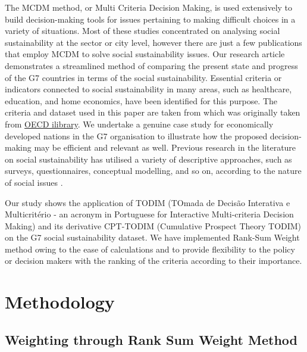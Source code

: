 \documentclass{infor}
\theoremstyle{remark}
\begin{document}
The MCDM method, or Multi Criteria Decision Making, is used extensively to build decision-making tools for issues pertaining to making difficult choices in a variety of situations. Most of these studies \citep{kumar2020mcdm, khokhar2020evaluating, perez2021mcdm, torkayesh2021comparative, kumar2019development, anand2017evaluation, papathanasiou2016decision, mani2014supplier} concentrated on analysing social sustainability at the sector or city level, however there are just a few publications that employ MCDM to solve social sustainability issues. Our research article demonstrates a streamlined method of comparing the present state and progress of the G7 countries in terms of the social sustainability. Essential criteria or indicators connected to social sustainability in many areas, such as healthcare, education, and home economics, have been identified for this purpose. The criteria and dataset used in this paper are taken from \cite{torkayesh2021comparative} which was originally taken from \href{https://www.oecd-ilibrary.org/}{OECD ilibrary}. We undertake a genuine case study for economically developed nations in the G7 organisation to illustrate how the proposed decision-making may be efficient and relevant as well. Previous research in the literature on social sustainability has utilised a variety of descriptive approaches, such as surveys, questionnaires, conceptual modelling, and so on, according to the nature of social issues \citep{abousaeidi2020developing, navas2020colombian, d2019social, hussain2018exploration, mani2016social}.

Our study shows the application of TODIM (TOmada de Decisão Interativa e Multicritério - an acronym in Portuguese for Interactive Multi-criteria Decision Making) \citep{gomes2009application} and its derivative CPT-TODIM (Cumulative Prospect Theory TODIM) \citep{tian2019extended} on the G7 social sustainability dataset. We have implemented Rank-Sum Weight method \citep{einhorn1977simple, stillwell1981comparison, jia1998attribute, hu2007selection} owing to the ease of calculations and to provide flexibility to the policy or decision makers with the ranking of the criteria according to their importance.

\section{Methodology}
\subsection{Weighting through Rank Sum Weight
Method}
\end{document}
